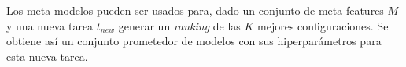 
\quad


Los meta-modelos pueden ser usados para, dado un conjunto de meta-features $M$ y una nueva tarea $t_{new}$ generar un \textit{ranking} de las $K$ mejores configuraciones. Se obtiene así un conjunto prometedor de modelos con sus hiperparámetros para esta nueva tarea.
 
